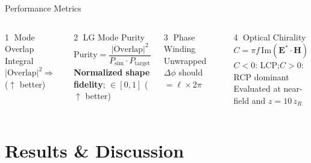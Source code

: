 \documentclass[aspectratio=169, 10pt]{beamer}
\begin{document}
\begin{frame}{Performance Metrics}

  \begin{columns}[T]
      \begin{block}{\textcircled{1} Mode Overlap Integral}
        $|\text{Overlap}|^2$$\Rightarrow$  {\scriptsize\textcolor{accentgreen}{($\uparrow$ better)}}
      \end{block}
      \vspace{1pt}
      \begin{block}{\textcircled{2} LG Mode Purity}
        \[ \text{Purity}=\frac{|\text{Overlap}|^2}{P_\text{sim} \cdot P_\text{target}}\]
        \textbf{Normalized shape fidelity}; $\in[0,1]$ {\scriptsize\textcolor{accentgreen}{($\uparrow$ better)}}
      \end{block}
      \begin{block}{\textcircled{3} Phase Winding}
        Unwrapped $\Delta\phi$ should $=\ell\times2\pi$\\
      \end{block}
      \vspace{1pt}
      \begin{block}{\textcircled{4} Optical Chirality}
        $C=\pi f\,\mathrm{Im}(\mathbf{E}^*\cdot\mathbf{H})$\\
        $C<0$: LCP;\quad $C>0$: RCP dominant\\
        Evaluated at near-field and $z=10\,z_R$
      \end{block}
    \vspace{2pt}
  \end{columns}
\end{frame}



\section{Results \& Discussion}




\begin{frame}[plain]
\end{frame}
\end{document}
